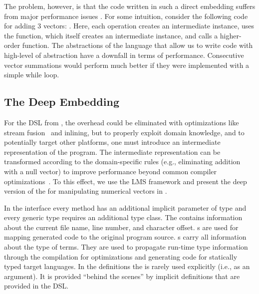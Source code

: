 The problem, however, is that the code written in such a direct embedding suffers from major performance issues \cite{rompf_optimizing_2013}. For some intuition, consider the following code for adding 3 vectors: . Here, each \code{+} operation creates an intermediate  instance, uses the  function, which itself creates an intermediate  instance, and calls a higher-order  function. The abstractions of the language that allow us to write code with high-level of abstraction have a downfall in terms of performance. Consecutive vector summations would perform much better if they were implemented with a simple while loop.

\subsection{The Deep Embedding}
For the DSL from , the overhead could be eliminated with
optimizations like stream fusion~\cite{coutts_stream_2007} and inlining, but to
properly exploit domain knowledge, and to potentially target other platforms,
one must introduce an intermediate representation of the \edsl program. The
intermediate representation can be transformed according to the domain-specific rules
 (e.g., eliminating addition with a null vector) to improve performance beyond common compiler
optimizations~\cite{rompf_optimizing_2013}. To this effect, we use the LMS
framework and present the deep version of the \edsl{} for manipulating numerical vectors in
.

In the  interface every method has an additional implicit
parameter of type  and every generic type requires an
additional  type class. The  contains information
about the current file name, line number, and character offset.
s are used for mapping generated code to the original
program source. s carry all information about the type of terms.
They are used to propagate run-time type information through the \edsl{}
compilation for optimizations and generating code for statically typed target
languages. In the \edsl definitions the  is rarely used
explicitly (i.e., as an argument). It is provided ``behind the scenes'' by implicit
definitions that are provided in the DSL.

